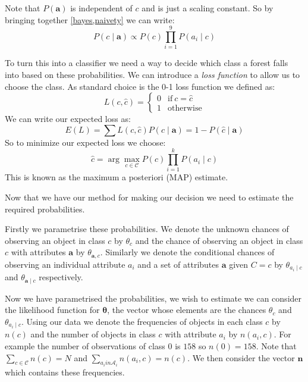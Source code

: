 Note that $P(\mathbf{a})$ is independent of $c$ and is just a scaling constant. So by bringing together \cref{bayes,naivety} we can write:
\begin{equation}
	P(c \mid \mathbf{a}) \propto P(c)\prod_{i=1}^{9}P(a_i \mid c)
\end{equation}

To turn this into a classifier we need a way to decide which class a forest falls into based on these probabilities.
We can introduce a \textit{loss function} to allow us to choose the class.
As standard choice is the 0-1 loss function we defined as:
\begin{equation}\label{0-1_loss_function}
	L(c, \hat{c}) = 
	\begin{cases}
		0 & \text{if}\ c = \hat{c} \\
		1 & \text{otherwise}
	\end{cases}
\end{equation}
We can write our expected loss as:
\begin{equation}
	E(L) = \sum L(c, \hat{c})P(c \mid \mathbf{a}) = 1 - P(\hat{c} \mid \mathbf{a})
\end{equation}
So to minimize our expected loss we choose:
\begin{equation} \label{mle_estimate}
	\hat c = \arg\max_{c \in \mathcal{C}} P(c)\prod_{i=1}^{k}P(a_i \mid c)
\end{equation}
This is known as the maximum a posteriori (MAP) estimate.

Now that we have our method for making our decision we need to estimate the required probabilities.

Firstly we parametrise these probabilities.
We denote the unknown chances of observing an object in class $c$ by $\theta_c$ and the chance of observing an object in class $c$ with attributes $\mathbf{a}$ by $\theta_{\mathbf{a}, c}$.
Similarly we denote the conditional chances of observing an individual attribute $a_i$ and a set of attributes $\mathbf{a}$ given $C=c$ by $\theta_{a_i \mid c}$ and $\theta_{\mathbf{a} \mid c}$ respectively.

Now we have parametrised the probabilities, we wish to estimate we can consider the likelihood function for $\mathbf{\theta}$, the vector whose elements are the chances $\theta_{c}$ and $\theta_{a_i \mid c}$.
Using our data we denote the frequencies of objects in each class $c$ by $n(c)$ and the number of objects in class $c$ with attribute $a_i$ by $n(a_i, c)$.
For example the number of observations of class $0$ is $158$ so $n(0) = 158$.
Note that $\sum_{c \in \mathcal{C}}n(c) = N$ and $\sum_{a_i in \mathcal{A}_i}n(a_i, c) = n(c)$.
We then consider the vector $\mathbf{n}$ which contains these frequencies.

